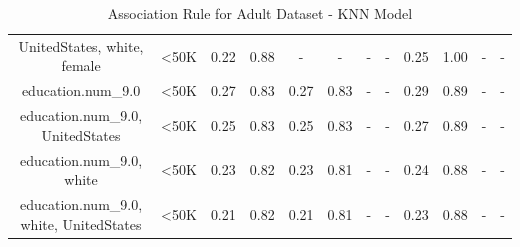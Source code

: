 \begin{table}[H]
{\begin{tabular}{|c|c|c|c|c|c|c|c|c|c|c|c|}
UnitedStates, white, female & <50K & 0.22 & 0.88 & - & - & - & - & 0.25 & 1.00 & - & - \\
education.num\_9.0 & <50K & 0.27 & 0.83 & 0.27 & 0.83 & - & - & 0.29 & 0.89 & - & - \\
education.num\_9.0, UnitedStates & <50K & 0.25 & 0.83 & 0.25 & 0.83 & - & - & 0.27 & 0.89 & - & - \\
education.num\_9.0, white & <50K & 0.23 & 0.82 & 0.23 & 0.81 & - & - & 0.24 & 0.88 & - & - \\
education.num\_9.0, white, UnitedStates & <50K & 0.21 & 0.82 & 0.21 & 0.81 & - & - & 0.23 & 0.88 & - & - \\
        \hline
        \end{tabular}
        }
        \\[10pt]
        \caption{Association Rule for Adult Dataset - KNN Model}
        \label{table:asso_rules_adult_KNN}
        \end{table}
        